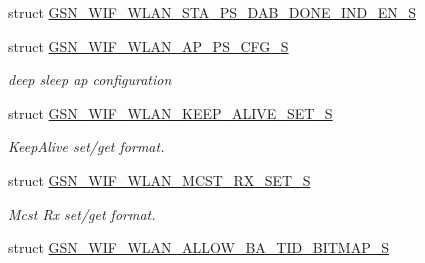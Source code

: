 \begin{DoxyCompactItemize}
\item 
struct \hyperlink{a00404}{GSN\_\-WIF\_\-WLAN\_\-STA\_\-PS\_\-DAB\_\-DONE\_\-IND\_\-EN\_\-S}
\item 
struct \hyperlink{a00368}{GSN\_\-WIF\_\-WLAN\_\-AP\_\-PS\_\-CFG\_\-S}
\begin{DoxyCompactList}\small\item\em deep sleep ap configuration \end{DoxyCompactList}\item 
struct \hyperlink{a00385}{GSN\_\-WIF\_\-WLAN\_\-KEEP\_\-ALIVE\_\-SET\_\-S}
\begin{DoxyCompactList}\small\item\em KeepAlive set/get format. \end{DoxyCompactList}\item 
struct \hyperlink{a00389}{GSN\_\-WIF\_\-WLAN\_\-MCST\_\-RX\_\-SET\_\-S}
\begin{DoxyCompactList}\small\item\em Mcst Rx set/get format. \end{DoxyCompactList}\item 
struct \hyperlink{a00365}{GSN\_\-WIF\_\-WLAN\_\-ALLOW\_\-BA\_\-TID\_\-BITMAP\_\-S}
\end{DoxyCompactItemize}
